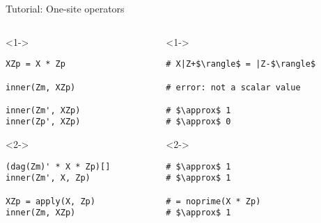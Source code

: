 \begin{frame}[fragile]{Tutorial: One-site operators}


\begin{columns}

\begin{column}{4.5cm}

\begin{onlyenv}<1->

\begin{lstlisting}[language=JuliaLocal, style=julia, basicstyle=\small]
XZp = X * Zp

inner(Zm, XZp)

inner(Zm', XZp)
inner(Zp', XZp)
\end{lstlisting}

\end{onlyenv}

\begin{onlyenv}<2->

\begin{lstlisting}[language=JuliaLocal, style=julia, basicstyle=\small]
(dag(Zm)' * X * Zp)[]
inner(Zm', X, Zp)

XZp = apply(X, Zp)
inner(Zm, XZp)
\end{lstlisting}

\end{onlyenv}

\end{column}

\begin{column}{4.5cm}

\begin{onlyenv}<1->

\begin{lstlisting}[style=julia, numbers=none, mathescape, basicstyle=\small]
# X|Z+$\rangle$ = |Z-$\rangle$

# error: not a scalar value

# $\approx$ 1
# $\approx$ 0
\end{lstlisting}

\end{onlyenv}

\begin{onlyenv}<2->

\begin{lstlisting}[style=julia, numbers=none, mathescape, basicstyle=\small]
# $\approx$ 1
# $\approx$ 1

# = noprime(X * Zp)
# $\approx$ 1
\end{lstlisting}

\end{onlyenv}

\end{column}

\end{columns}

\end{frame}
